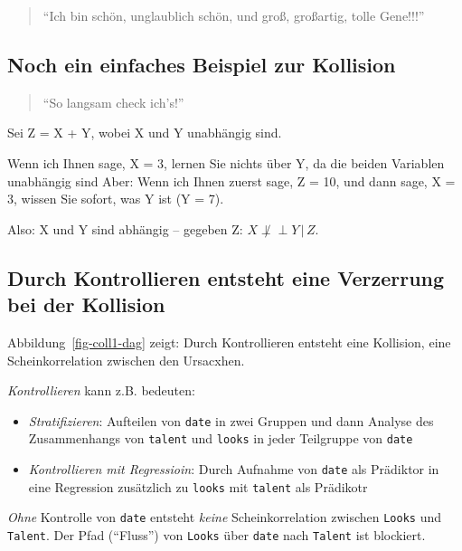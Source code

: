 \documentclass[
  a4paper,
  DIV=11]{scrreprt}
\providecommand{\tightlist}{%
  \setlength{\itemsep}{0pt}\setlength{\parskip}{0pt}}\usepackage{longtable,booktabs,array}
\theoremstyle{definition}
\theoremstyle{remark}
\begin{document}
\begin{quote}
``Ich bin schön, unglaublich schön, und groß, großartig, tolle Gene!!!''
🧑
\end{quote}

\hypertarget{noch-ein-einfaches-beispiel-zur-kollision}{%
\subsection{Noch ein einfaches Beispiel zur
Kollision}\label{noch-ein-einfaches-beispiel-zur-kollision}}

\begin{quote}
``So langsam check ich's!''
\end{quote}

Sei Z = X + Y, wobei X und Y unabhängig sind.

Wenn ich Ihnen sage, X = 3, lernen Sie nichts über Y, da die beiden
Variablen unabhängig sind Aber: Wenn ich Ihnen zuerst sage, Z = 10, und
dann sage, X = 3, wissen Sie sofort, was Y ist (Y = 7).

Also: X und Y sind abhängig -- gegeben Z:
\(X \not\perp \!\!\! \perp Y \,|\, Z\).

\hypertarget{durch-kontrollieren-entsteht-eine-verzerrung-bei-der-kollision}{%
\subsection{Durch Kontrollieren entsteht eine Verzerrung bei der
Kollision}\label{durch-kontrollieren-entsteht-eine-verzerrung-bei-der-kollision}}

Abbildung~\ref{fig-coll1-dag} zeigt: Durch Kontrollieren entsteht eine
Kollision, eine Scheinkorrelation zwischen den Ursacxhen.

\emph{Kontrollieren} kann z.B. bedeuten:

\begin{itemize}
\tightlist
\item
  \emph{Stratifizieren}: Aufteilen von \texttt{date} in zwei Gruppen und
  dann Analyse des Zusammenhangs von \texttt{talent} und \texttt{looks}
  in jeder Teilgruppe von \texttt{date}
\item
  \emph{Kontrollieren mit Regressioin}: Durch Aufnahme von \texttt{date}
  als Prädiktor in eine Regression zusätzlich zu \texttt{looks} mit
  \texttt{talent} als Prädikotr
\end{itemize}

\emph{Ohne} Kontrolle von \texttt{date} entsteht \emph{keine}
Scheinkorrelation zwischen \texttt{Looks} und \texttt{Talent}. Der Pfad
(``Fluss'') von \texttt{Looks} über \texttt{date} nach \texttt{Talent}
ist blockiert.
\end{document}
